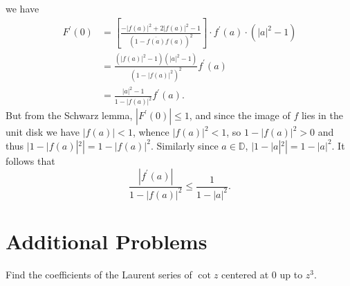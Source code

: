 \documentclass{article}
\newcounter{Problem}
\newenvironment{Problem}{\begin{Exercise}[name={Problem},
                                          counter={Problem}]}
                        {\end{Exercise}}
\begin{document}
we have
\begin{align*}
   F^\prime(0)
&= \left[
     \frac{-|f(a)|^2 + 2|f(a)|^2 - 1}
          {(1 - \overline{f(a)} f(a))^2}
   \right]
   \cdot
   f^\prime(a)
   \cdot
   (|a|^2 - 1) \\
&= \frac{(|f(a)|^2 - 1)(|a|^2 - 1)}
         {(1 - |f(a)|^2)^2}
    f^\prime(a) \\
&= \frac{|a|^2 - 1}
        {1 - |f(a)|^2}
   f^\prime(a).
\end{align*}
But from the Schwarz lemma, $|F^\prime(0)| \leq 1$,
and since the image of $f$ lies in the unit disk we have
$|f(a)| < 1$, whence $|f(a)|^2 < 1$, so $1 - |f(a)|^2 > 0$
and thus $|1 - |f(a)|^2| = 1 - |f(a)|^2$. Similarly since
$a \in \mathbb{D}$, $|1 - |a|^2| = 1 - |a|^2$. It follows
that
$$
     \frac{|f^\prime(a)|}
          {1 - |f(a)|^2}
\leq \frac{1}{1 - |a|^2}.
$$

\section{Additional Problems}

\begin{Problem}
  Find the coefficients of the Laurent series of
  $\cot z$ centered at $0$ up to $z^3$.
\end{Problem}
\end{document}
